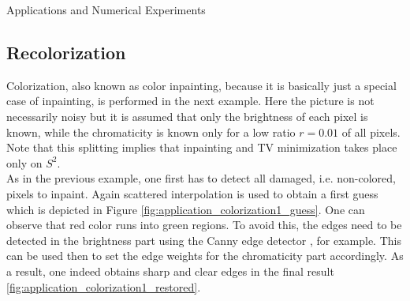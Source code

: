 \begin{chapter}{Applications and Numerical Experiments}


\FloatBarrier
\subsection{Recolorization} %
\label{sub:Recolorization}
Colorization, also known as color inpainting, because it is basically just a special case of inpainting, is performed in the next example.
Here the picture is not necessarily noisy but it is assumed that only the brightness of each pixel is known, while the chromaticity is known only for a low ratio $r=0.01$ of all pixels.
Note that this splitting implies that inpainting and TV minimization takes place only on $S^2$.\\

As in the previous example, one first has to detect all damaged, i.e. non-colored, pixels to inpaint. Again scattered interpolation is
used to obtain a first guess which is depicted
in Figure \ref{fig:application_colorization1_guess}. One can observe that red color runs into green regions. To avoid this, the edges need to be detected in the brightness part using the Canny edge detector \cite{Canny}, for example. This
can be used then to set the edge weights for the chromaticity part accordingly. As a result, one indeed
obtains sharp and clear edges in the final result \ref{fig:application_colorization1_restored}.


\end{chapter}

